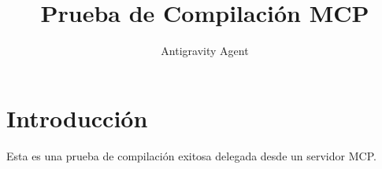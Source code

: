 \documentclass{article}
\title{Prueba de Compilación MCP}
\author{Antigravity Agent}
\begin{document}
\maketitle
\section{Introducción}
Esta es una prueba de compilación exitosa delegada desde un servidor MCP.
\end{document}
